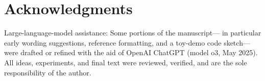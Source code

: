 \documentclass[11pt]{article}
\begin{document}
\section*{Acknowledgments}

Large-language-model assistance: Some portions of the manuscript—
in particular early wording suggestions, reference formatting, and a toy-demo
code sketch—were drafted or refined with the aid of OpenAI ChatGPT
(model o3, May 2025). All ideas, experiments, and final text were reviewed,
verified, and are the sole responsibility of the author.

\printbibliography
\end{document}

